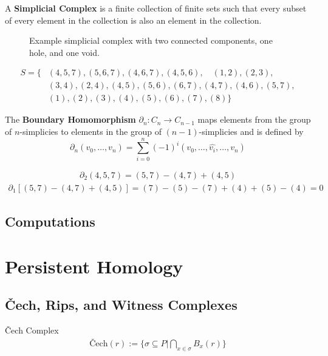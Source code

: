 \begin{frame}
	\begin{definition}
		A \textbf{Simplicial Complex} is a finite collection of finite sets such that every subset of every element in the collection is also an element in the collection. \cite{wagner}
	\end{definition}
	\begin{figure}
		
		\caption{Example simplicial complex with two connected components, one hole, and one void.}
	\end{figure}
	\begin{align*}
		S = \{
			&(4,5,7), (5,6,7), (4,6,7), (4,5,6),\quad (1,2), (2,3),\\ &(3,4), (2,4), (4,5), (5,6),(6,7),(4,7),(4,6),(5,7),\\
			&(1), (2), (3), (4), (5), (6), (7), (8)
		\}
	\end{align*}
\end{frame}

\begin{frame}
	\begin{definition}
		The \textbf{Boundary Homomorphism} \(\partial_n : C_n \to C_{n-1}\) maps elements from the group of \(n\)-simplicies to elements in the group of \((n-1)\)-simplicies and is defined by
		\[
			\partial_n (v_0,\dots , v_{n}) = \sum_{i=0}^n (-1)^{i}
			(v_0,\dots, \widehat{v_i}, \dots, v_n)
		\]
		\cite{hatcher}
	\end{definition}
	\begin{align*}
		\partial_2 (4,5,7) = (5,7) - (4,7) + (4,5)
	\end{align*}
	\begin{align*}
		\partial_1 [(5,7) - (4,7) + (4,5)] = (7) - (5) - (7) + (4) + (5) - (4) = 0
	\end{align*}
\end{frame}
\subsection{Computations}
\begin{frame}
\end{frame}


\section[Persistence]{Persistent Homology}
\subsection{\v{C}ech, Rips, and Witness Complexes}
\begin{frame}
	\begin{block}{\v{C}ech Complex}
		\begin{align*}
			\text{\v{C}ech}(r) := \{ \sigma \subseteq P
				| \bigcap_{x\in \sigma} B_x(r) \}
		\end{align*}
		\cite{wagner}
	\end{block}
\end{frame}


